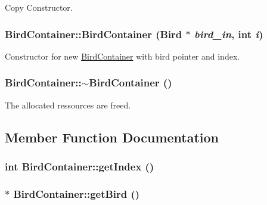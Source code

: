 Copy Constructor. 

\hypertarget{structBirdContainer_963cb7c76ed9fc03dfcd097c0f67e112}{
\subsubsection{\setlength{\rightskip}{0pt plus 5cm}BirdContainer::BirdContainer ({\bf Bird} $\ast$ {\em bird\_\-in}, \/  int {\em i})}}
\label{structBirdContainer_963cb7c76ed9fc03dfcd097c0f67e112}


Constructor for new \hyperlink{structBirdContainer}{BirdContainer} with bird pointer and index. 

\hypertarget{structBirdContainer_49cffc821a946e263b1227d70f79b4e0}{
\subsubsection{\setlength{\rightskip}{0pt plus 5cm}BirdContainer::$\sim$BirdContainer ()}}
\label{structBirdContainer_49cffc821a946e263b1227d70f79b4e0}


The allocated ressources are freed. 



\subsection{Member Function Documentation}
\hypertarget{structBirdContainer_b3d7a5dc1ee60589def9bac243b8c33f}{
\subsubsection{\setlength{\rightskip}{0pt plus 5cm}int BirdContainer::getIndex ()}}
\label{structBirdContainer_b3d7a5dc1ee60589def9bac243b8c33f}


\hypertarget{structBirdContainer_ae0fbf2b634f5f92c4b80c6f89727318}{
\subsubsection{$\ast$ BirdContainer::getBird ()}}
\label{structBirdContainer_ae0fbf2b634f5f92c4b80c6f89727318}




